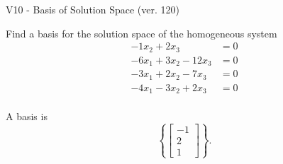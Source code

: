 \begin{exercise}
  \begin{exerciseTitle}V10 - Basis of Solution Space (ver. 120)\end{exerciseTitle}
  \begin{exerciseStatement}
    Find a basis for the solution space of the homogeneous system 
\begin{align*}
 -1 x_ 2 + 2 x_ 3 &= 0  \\ 
  -6 x_ 1 + 3 x_ 2 -12 x_ 3 &= 0  \\ 
  -3 x_ 1 + 2 x_ 2 -7 x_ 3 &= 0  \\ 
  -4 x_ 1 -3 x_ 2 + 2 x_ 3 &= 0  \\ 
 \end{align*}


 
  \end{exerciseStatement}

  \begin{exerciseAnswer}
   A basis is   
\[\left\{\left[\begin{array}{c}
-1 \\
2 \\
1
\end{array}\right]\right\}.\]

  


  \end{exerciseAnswer}
\end{exercise}